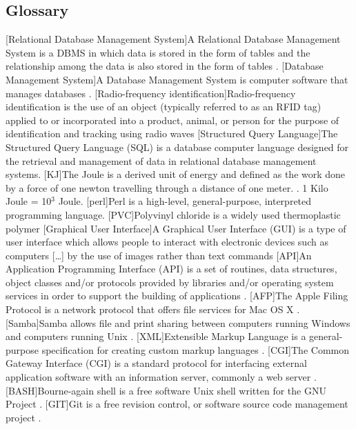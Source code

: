 \documentclass[a4paper,10pt,twoside,titlepage,headings=small,bibliography=totocnumbered,headsepline]{scrartcl}
\begin{document}
\begin{appendix}
\section{Glossary}
\begin{acronym}
[Relational Database Management System]{A Relational Database Management System is a \acs{DBMS} in which data is stored in the form of tables and the relationship among the data is also stored in the form of tables \citep{wiki:rdbms}.}
[Database Management System]{A Database Management System is computer software that manages databases \citep{wiki:dbms}.}
[Radio-frequency identification]{Radio-frequency identification is the use of an object (typically referred to as an RFID tag) applied to or incorporated into a product, animal, or person for the purpose of identification and tracking using radio waves \citep{wiki:rfid}}
[Structured Query Language]{The Structured Query Language (SQL) is a database computer language designed for the retrieval and management of data in relational database management systems.\citep{wiki:sql}}
[KJ]{The Joule is a derived unit of energy and defined as the work done by a force of one newton travelling through a distance of one meter. \citep{wiki:joule}. 1 Kilo Joule = 10$^3$ Joule.}
[perl]{Perl is a high-level, general-purpose, interpreted programming language. \citep{wiki:perl}}
[PVC]{Polyvinyl chloride is a widely used thermoplastic polymer \citep{wiki:pvc}}
[Graphical User Interface]{A Graphical User Interface (GUI) is a type of user interface which allows people to interact with electronic devices such as computers [\ldots] by the use of images rather than text commands \citep{wiki:gui}}
[API]{An Application Programming Interface (API) is a set of routines, data structures, object classes and/or protocols provided by libraries and/or operating system services in order to support the building of applications \citep{wiki:api}.}
[AFP]{The Apple Filing Protocol is a network protocol that offers file services for Mac OS X \citep{wiki:afp}.}
[Samba]{Samba allows file and print sharing between computers running Windows and computers running Unix \citep{wiki:samba}.}
[XML]{Extensible Markup Language is a general-purpose specification for creating custom markup languages \citep{wiki:xml}.}
[CGI]{The Common Gateway Interface (CGI) is a standard protocol for interfacing external application software with an information server, commonly a web server \citep{wiki:cgi}.}
[BASH]{Bourne-again shell is a free software Unix shell written for the GNU Project \citep{wiki:bash}.}
[GIT]{Git is a free revision control, or software source code management project \citep{wiki:git}.}
\end{acronym}

\end{appendix}
\end{document}
